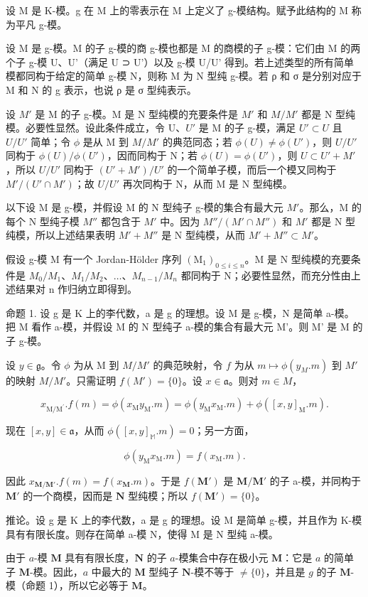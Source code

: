 设 M 是 K-模。g 在 M 上的零表示在 M 上定义了 g-模结构。赋予此结构的 M 称为平凡 g-模。

设 M 是 g-模。M 的子 g-模的商 g-模也都是 M 的商模的子 g-模：它们由 M 的两个子 g-模 U、U'（满足 U ⊃ U'）以及 g-模 U/U' 得到。若上述类型的所有简单模都同构于给定的简单 g-模 N，则称 M 为 N 型纯 g-模。若 ρ 和 σ 是分别对应于 M 和 N 的 g 表示，也说 ρ 是 σ 型纯表示。

设 \(M'\) 是 M 的子 g-模。M 是 N 型纯模的充要条件是 \(M'\) 和 \(M/M'\) 都是 N 型纯模。必要性显然。设此条件成立，令 U、\(U'\) 是 M 的子 g-模，满足 \(U' \subset U\) 且 \(U/U'\) 简单；令 \(\phi\) 是从 M 到 \(M/M'\) 的典范同态；若 \(\phi(U) \neq \phi(U')\)，则 \(U/U'\) 同构于 \(\phi(U)/\phi(U')\)，因而同构于 N；若 \(\phi(U) = \phi(U')\)，则 \(U \subset U' + M'\)，所以 \(U/U'\) 同构于 \((U' + M')/U'\) 的一个简单子模，而后一个模又同构于 \(M'/(U' \cap M')\)；故 \(U/U'\) 再次同构于 N，从而 M 是 N 型纯模。

以下设 M 是 g-模，并假设 M 的 N 型纯子 g-模的集合有最大元 \(M'\)。那么，M 的每个 N 型纯子模 \(M''\) 都包含于 \(M'\) 中。因为 \(M''/(M' \cap M'')\) 和 \(M'\) 都是 N 型纯模，所以上述结果表明 \(M' + M''\) 是 N 型纯模，从而 \(M' + M'' \subset M'\)。

假设 g-模 M 有一个 Jordan-Hölder 序列 \((\mathrm{M}_{1})_{0\leqslant i\leqslant n}\)。M 是 N 型纯模的充要条件是 \(M_{0}/M_{1}\)、\(M_{1}/M_{2}\)、\(\ldots\)、\(M_{n-1}/M_{n}\) 都同构于 N；必要性显然，而充分性由上述结果对 n 作归纳立即得到。

命题 1. 设 g 是 K 上的李代数，a 是 g 的理想。设 M 是 g-模，N 是简单 a-模。把 M 看作 a-模，并假设 M 的 N 型纯子 a-模的集合有最大元 M'。则 M' 是 M 的子 g-模。

设 \(y \in \mathfrak{g}\)。令 \(\phi\) 为从 M 到 \(M / M'\) 的典范映射，令 \(f\) 为从 \(m \mapsto \phi(y_M. m)\) 到 \(M'\) 的映射 \(M / M'\)。只需证明 \(f(M') = \{0\}\)。设 \(x \in \mathfrak{a}\)。则对 \(m \in M\)，

\[
x _ {\mathrm{M} / \mathrm{M} ^ {\prime}}. f (m) = \phi (x _ {\mathrm{M}} y _ {\mathrm{M}}. m) = \phi (y _ {\mathrm{M}} x _ {\mathrm{M}}. m) + \phi ([ x, y ] _ {\mathrm{M}}. m).
\]

现在 \([x,y] \in \mathfrak{a}\)，从而 \(\phi([x,y]_{\mathbb{M}}.m) = 0\)；另一方面，

\[
\phi (y _ {\mathrm{M}} x _ {\mathrm{M}}. m) = f (x _ {\mathrm{M}}. m).
\]

因此 \(x_{\mathbf{M} / \mathbf{M}'} . f(m) = f(x_{\mathbf{M}}.m)\)。于是 \(f(\mathbf{M}')\) 是 \(\mathbf{M} / \mathbf{M}'\) 的子 a-模，并同构于 \(\mathbf{M}'\) 的一个商模，因而是 \(\mathbf{N}\) 型纯模；所以 \(f(\mathbf{M}') = \{0\}\)。

推论。设 g 是 K 上的李代数，a 是 g 的理想。设 M 是简单 g-模，并且作为 K-模具有有限长度。则存在简单 a-模 N，使得 M 是 N 型纯 a-模。

由于 \(a\)-模 \(\mathbf{M}\) 具有有限长度，\(\mathbf{N}\) 的子 \(a\)-模集合中存在极小元 \(\mathbf{M}\)：它是 \(a\) 的简单子 \(\mathbf{M}\)-模。因此，\(a\) 中最大的 \(\mathbf{M}\) 型纯子 \(\mathbf{N}\)-模不等于 \(\neq \{0\}\)，并且是 \(g\) 的子 \(\mathbf{M}\)-模（命题 1），所以它必等于 \(\mathbf{M}\)。

